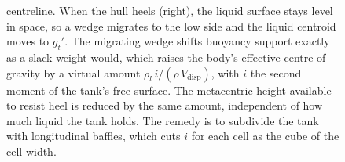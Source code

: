 \begin{figure}[htbp]
{centreline. When the hull heels (right), the liquid surface stays level in
space, so a wedge migrates to the low side and the liquid centroid moves to
$g_t'$. The migrating wedge shifts buoyancy support exactly as a slack
weight would, which raises the body's effective centre of gravity by a
virtual amount $\rho_l\, i/(\rho\, V_{\mathrm{disp}})$, with $i$ the second
moment of the tank's free surface. The metacentric height available to
resist heel is reduced by the same amount, independent of how much liquid
the tank holds. The remedy is to subdivide the tank with longitudinal
baffles, which cuts $i$ for each cell as the cube of the cell width.}
\label{fig:vol03ch10:free-surface}
\end{figure}
